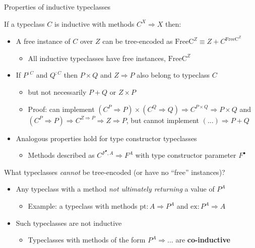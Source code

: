 \documentclass[english,,russian]{beamer}
\begin{document}
\begin{frame}{Properties of inductive typeclasses}

If a typeclass $C$ is inductive with methods $C^{X}\Rightarrow X$
then:
\begin{itemize}
\item A free instance of $C$ over $Z$ can be tree-encoded as {\footnotesize{}$\text{FreeC}^{Z}\equiv Z+C^{\text{FreeC}^{Z}}$} 
\begin{itemize}
\item All inductive typeclasses have free instances, $\text{FreeC}^{Z}$
\end{itemize}
\item If $P^{:C}$ and $Q^{:C}$ then $P\times Q$ and $Z\Rightarrow P$
also belong to typeclass $C$
\begin{itemize}
\item but not necessarily $P+Q$ or $Z\times P$
\item Proof: can implement $(C^{P}\Rightarrow P)\times(C^{Q}\Rightarrow Q)\Rightarrow C^{P\times Q}\Rightarrow P\times Q$
and $\left(C^{P}\Rightarrow P\right)\Rightarrow C^{Z\Rightarrow P}\Rightarrow Z\Rightarrow P$,
but cannot implement $\left(...\right)\Rightarrow P+Q$
\end{itemize}
\item Analogous properties hold for type constructor typeclasses
\begin{itemize}
\item Methods described as $C^{F^{\bullet},A}\Rightarrow F^{A}$ with type
constructor parameter $F^{\bullet}$
\end{itemize}
\end{itemize}
What typeclasses \emph{cannot} be tree-encoded (or have no ``free''
instances)?
\begin{itemize}
\item Any typeclass with a method \emph{not ultimately returning} a value
of $P^{A}$
\begin{itemize}
\item Example: a typeclass with methods $\text{pt}:A\Rightarrow P^{A}$
and $\text{ex}:P^{A}\Rightarrow A$
\end{itemize}
\item Such typeclasses are not inductive
\begin{itemize}
\item Typeclasses with methods of the form $P^{A}\Rightarrow...$ are \textbf{co-inductive}
\end{itemize}
\end{itemize}
\end{frame}
\end{document}
